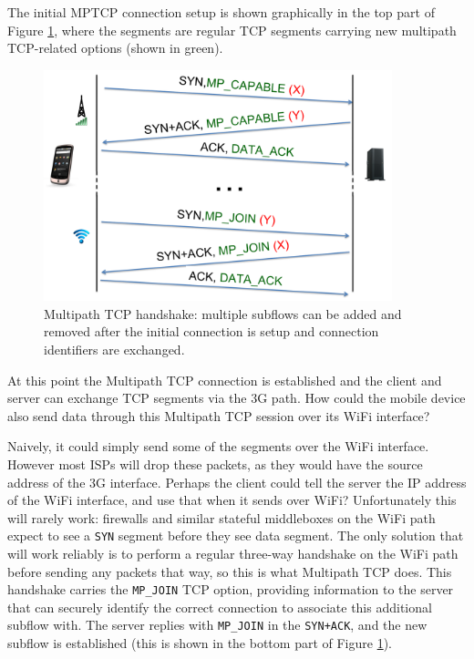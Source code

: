 The initial MPTCP connection setup is shown graphically in the top part of Figure \ref{fig:mptcp_handshake},
where the segments are regular TCP segments carrying new multipath TCP-related options (shown in green).

\begin{figure}[t]
\centering
\includegraphics[width=0.9\textwidth]{figures/mptcp_handshake.png}
\caption{Multipath TCP handshake: multiple subflows can be added and removed after the initial
connection is setup and connection identifiers are exchanged.}
\label{fig:mptcp_handshake}
\end{figure}

At this point the Multipath TCP connection is established and the
client and server can exchange TCP segments via the 3G path. How
could the mobile device also send data through this Multipath TCP
session over its WiFi interface?

Naively, it could simply send some of the segments over the WiFi
interface.  However most ISPs will drop these packets, as they would
have the source address of the 3G interface.  Perhaps the client could
tell the server the IP address of the WiFi interface, and use that
when it sends over WiFi?  Unfortunately this will rarely work:
firewalls and similar stateful middleboxes on the WiFi path expect to
see a \texttt{SYN} segment before they see data segment.  The only solution that
will work reliably is to perform a regular three-way handshake on the WiFi path
before sending any packets that way, so this is what Multipath TCP
does.  This handshake carries the \texttt{MP\_JOIN} TCP option, providing
information to the server that can securely identify the
correct connection to associate this additional subflow with.  The
server replies with \texttt{MP\_JOIN} in the \texttt{SYN+ACK}, and the new subflow is
established (this is shown in the bottom part of Figure \ref{fig:mptcp_handshake}). 


